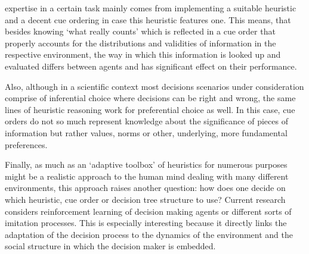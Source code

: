 expertise in a certain task mainly comes from implementing a suitable heuristic and a decent cue ordering in case this heuristic features one. This means, that besides knowing `what really counts' which is reflected in a cue order that properly accounts for the distributions and validities of information in the respective environment, the way in which this information is looked up and evaluated differs between agents and has significant effect on their performance.

Also, although in a scientific context most decisions scenarios under consideration comprise of inferential choice where decisions can be right and wrong, the same lines of heuristic reasoning work for preferential choice as well. In this case, cue orders do not so much represent knowledge about the significance of pieces of information but rather values, norms or other, underlying, more fundamental preferences.

Finally, as much as an `adaptive toolbox' of heuristics for numerous purposes might be a realistic approach to the human mind dealing with many different environments, this approach raises another question: how does one decide on which heuristic, cue order or decision tree structure to use? Current research \citep{garcia2009does,Rieskamp2006} considers reinforcement learning of decision making agents or different sorts of imitation processes. This is especially interesting because it directly links the adaptation of the decision process to the dynamics of the environment and the social structure in which the decision maker is embedded.\\

